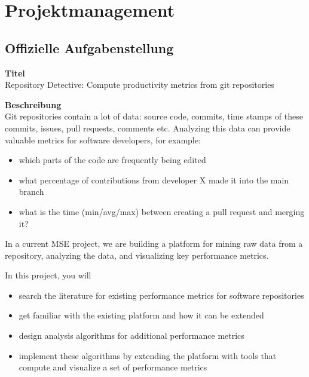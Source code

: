 


\chapter{Projektmanagement} %

\label{ApendixB} %

\section{Offizielle Aufgabenstellung}
\label{sec:OffAufgabenstellung}
\textbf{Titel}\\
Repository Detective: Compute productivity metrics from git repositories

\textbf{Beschreibung}\\
Git repositories contain a lot of data: source code, commits, time stamps of these commits, issues, pull requests, comments etc. Analyzing this data can provide valuable metrics for software developers, for example:

\begin{itemize}
    \item which parts of the code are frequently being edited
    \item what percentage of contributions from developer X made it into the main branch
    \item what is the time (min/avg/max) between creating a pull request and merging it?
\end{itemize}

In a current MSE project, we are building a platform for mining raw data from a repository, analyzing the data, and visualizing key performance metrics.

In this project, you will
\begin{itemize}
    \item search the literature for existing performance metrics for software repositories
    \item get familiar with the existing platform and how it can be extended   \item design analysis algorithms for additional performance metrics
    \item implement these algorithms by extending the platform with tools that compute and visualize a set of performance metrics
\end{itemize}

